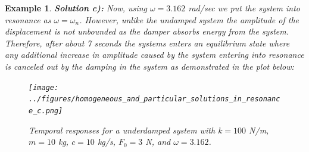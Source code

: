 \documentclass[12pt,letter]{article}
\newtheorem{ex}{Example}
\numberwithin{ex}{section} %
\newenvironment{example}{\begin{mdframed}[middlelinewidth=0.5mm]\begin{ex}\normalfont}{\end{ex}\end{mdframed}}
\numberwithin{re}{section} %
\numberwithin{pr}{section} %
\begin{document}
\begin{example}
				\noindent\textbf{Solution c):} Now, using $\omega=3.162$ rad/sec we put the system into resonance as $\omega=\omega_n$. However, unlike the undamped system  the amplitude of the displacement is not unbounded as the damper absorbs energy from the system. Therefore, after about 7 seconds the systems enters an equilibrium state where any additional increase in amplitude caused by the system entering into resonance is canceled out by the damping in the system as demonstrated in the plot below:
				\begin{figure}[H]
					\centering
					\texttt{[image: ../figures/homogeneous\_and\_particular\_solutions\_in\_resonance\_c.png]}
					\caption{Temporal responses for a underdamped system with $k=100$ N/m, $m=10$ kg,  $c=10$ kg/s, $F_0=3$ N, and $\omega = 3.162$.}
				\end{figure}				
			\end{example}	
\end{document}

